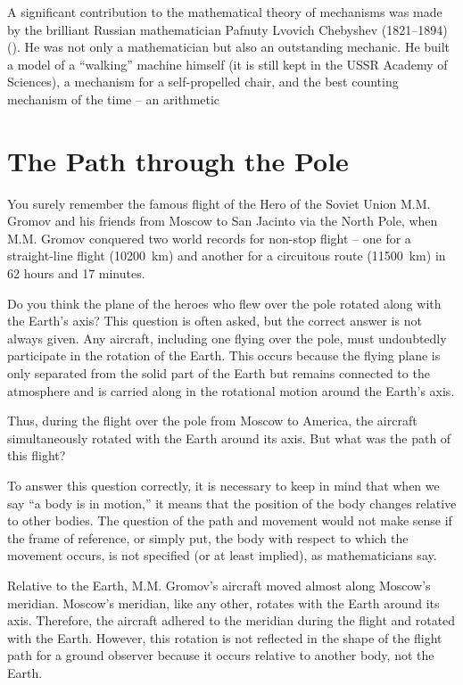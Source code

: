 A significant contribution to the mathematical theory of mechanisms was made by the brilliant Russian mathematician Pafnuty Lvovich Chebyshev (1821–1894) (). He was not only a mathematician but also an outstanding mechanic. He built a model of a ``walking'' machine himself (it is still kept in the USSR Academy of Sciences), a mechanism for a self-propelled chair, and the best counting mechanism of the time -- an arithmetic


\section{The Path through the Pole}
\label{sec-9.12}


You surely remember the famous flight of the Hero of the Soviet Union M.M. Gromov and his friends from Moscow to San Jacinto via the North Pole, when M.M. Gromov conquered two world records for non-stop flight -- one for a straight-line flight (\SI{10200}{\kilo\meter}) and another for a circuitous route (\SI{11500}{\kilo\meter}) in 62 hours and 17 minutes.

Do you think the plane of the heroes who flew over the pole rotated along with the Earth's axis? This question is often asked, but the correct answer is not always given. Any aircraft, including one flying over the pole, must undoubtedly participate in the rotation of the Earth. This occurs because the flying plane is only separated from the solid part of the Earth but remains connected to the atmosphere and is carried along in the rotational motion around the Earth's axis.

Thus, during the flight over the pole from Moscow to America, the aircraft simultaneously rotated with the Earth around its axis. But what was the path of this flight?

To answer this question correctly, it is necessary to keep in mind that when we say ``a body is in motion,'' it means that the position of the body changes relative to other bodies. The question of the path and movement would not make sense if the frame of reference, or simply put, the body with respect to which the movement occurs, is not specified (or at least implied), as mathematicians say.

Relative to the Earth, M.M. Gromov's aircraft moved almost along Moscow's meridian. Moscow's meridian, like any other, rotates with the Earth around its axis. Therefore, the aircraft adhered to the meridian during the flight and rotated with the Earth. However, this rotation is not reflected in the shape of the flight path for a ground observer because it occurs relative to another body, not the Earth.

